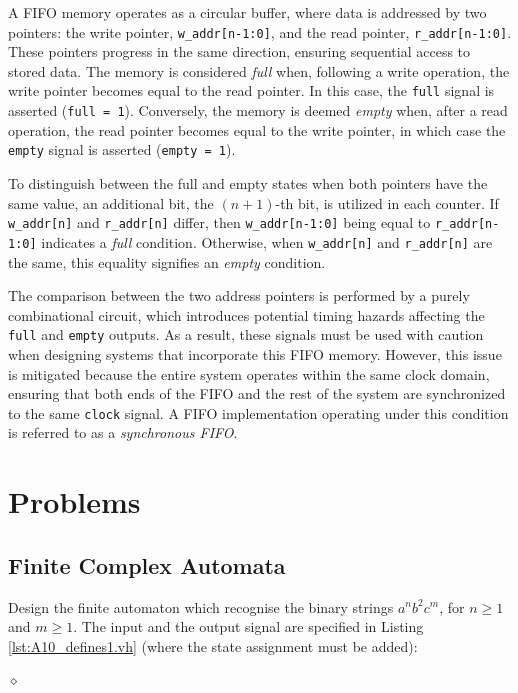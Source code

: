 A FIFO memory operates as a circular buffer, where data is addressed by two pointers: the write pointer, {\tt w\_addr[n-1:0]}, and the read pointer, {\tt r\_addr[n-1:0]}. These pointers progress in the same direction, ensuring sequential access to stored data. The memory is considered \textit{full} when, following a write operation, the write pointer becomes equal to the read pointer. In this case, the {\tt full} signal is asserted (\texttt{full = 1}). Conversely, the memory is deemed \textit{empty} when, after a read operation, the read pointer becomes equal to the write pointer, in which case the {\tt empty} signal is asserted (\texttt{empty = 1}).

To distinguish between the full and empty states when both pointers have the same value, an additional bit, the $(n+1)$-th bit, is utilized in each counter. If {\tt w\_addr[n]} and {\tt r\_addr[n]} differ, then {\tt w\_addr[n-1:0]} being equal to {\tt r\_addr[n-1:0]} indicates a \textit{full} condition. Otherwise, when {\tt w\_addr[n]} and {\tt r\_addr[n]} are the same, this equality signifies an \textit{empty} condition.


The comparison between the two address pointers is performed by a purely combinational circuit, which introduces potential timing hazards affecting the {\tt full} and {\tt empty} outputs. As a result, these signals must be used with caution when designing systems that incorporate this FIFO memory. However, this issue is mitigated because the entire system operates within the same clock domain, ensuring that both ends of the FIFO and the rest of the system are synchronized to the same {\tt clock} signal. A FIFO implementation operating under this condition is referred to as a \textit{synchronous FIFO}.

\section{Problems}
\subsection{Finite Complex Automata}

\begin{problem}
Design the finite automaton which recognise the binary strings $a^{n}b^2c^{m}$, for $n \geq 1$ and $m \geq 1$. The input and the output signal are specified in Listing \ref{lst:A10_defines1.vh} (where the state assignment must be added):
{\em
{}
}

$\diamond$
\end{problem}

